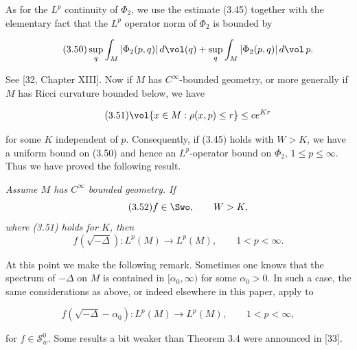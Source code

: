 As for the $L^{p}$ continuity of $\Phi_{2}$, we use the estimate (3.45) together with the elementary fact that the $L^{p}$ operator norm of $\Phi_{2}$ is bounded by

\begin{equation}\tag{3.50}
\sup_{q}\int_{M}|\Phi_{2}(p,q)|\,d\vol(q)+\sup_{q}\int_{M}|\Phi_{2}(p,q)|\,d\vol\,p.
\end{equation}

See [32, Chapter XIII]. Now if $M$ has $C^{\infty}$-bounded geometry, or more generally if $M$ has Ricci curvature bounded below, we have

\begin{equation}\tag{3.51}
\vol\{x\in M:\rho(x,p)\leq r\}\leq ce^{Kr}
\end{equation}

for some $K$ independent of $p$. Consequently, if (3.45) holds with $W>K$, we have a uniform bound on (3.50) and hence an $L^{p}$-operator bound on $\Phi_{2}$, $1\leq p\leq \infty$. Thus we have proved the following result.

\begin{theorem}
\label{thm:lp-continuity-strip-holomorphic-symbols}

\textit{Assume $M$ has $C^{\infty}$ bounded geometry. If}
\begin{equation}\tag{3.52}
f\in \Swo, \qquad W>K,
\end{equation}
\textit{where (3.51) holds for $K$, then}
\begin{equation}\tag{3.53}
f(\sqrt{-\Delta}): L^{p}(M)\to L^{p}(M), \qquad 1<p<\infty.
\end{equation}
\end{theorem}

At this point we make the following remark. Sometimes one knows that the spectrum of $-\Delta$ on $M$ is contained in $[\alpha_{0},\infty)$ for some $\alpha_{0}>0$. In such a case, the same considerations as above, or indeed elsewhere in this paper, apply to

\begin{equation}\tag{3.54}
 f(\sqrt{-\Delta}-\alpha_0): L^p(M) \to L^p(M), \qquad 1 < p < \infty,
\end{equation}

for $f\in \mathcal S_w^0$. Some results a bit weaker than Theorem 3.4 were announced in [33].

